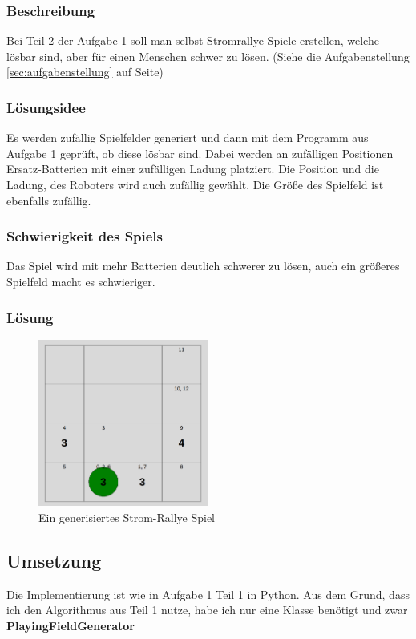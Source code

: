 \documentclass[a4paper,12pt,arial]{scrartcl}
\begin{document}
\subsubsection{Beschreibung}
Bei Teil 2 der Aufgabe 1 soll man selbst Stromrallye Spiele erstellen, welche lösbar sind, aber für einen Menschen schwer zu lösen.
(Siehe die Aufgabenstellung \ref{sec:aufgabenstellung} auf Seite\pageref{sec:aufgabenstellung})
\subsubsection{Lösungsidee}
Es werden zufällig Spielfelder generiert und dann mit dem Programm aus Aufgabe 1 geprüft, ob diese lösbar sind. Dabei werden an zufälligen Positionen Ersatz-Batterien mit einer zufälligen Ladung platziert. Die Position und die Ladung, des Roboters wird auch zufällig gewählt.
Die Größe des Spielfeld ist ebenfalls zufällig.
\subsubsection{Schwierigkeit des Spiels}
Das Spiel wird mit mehr Batterien deutlich schwerer zu lösen, auch ein größeres Spielfeld  macht es schwieriger.
\subsubsection{Lösung}
\begin{figure}[h]
    \centering
    \includegraphics[width=0.5\textwidth]{aufgabe1_2_solution.png}
    \caption{Ein generisiertes Strom-Rallye Spiel}
    \label{fig:loesung2}
\end{figure}
\newpage
\subsection{Umsetzung}
Die Implementierung ist wie in Aufgabe 1 Teil 1 in Python. Aus dem Grund, dass ich den Algorithmus aus Teil 1 nutze, habe ich nur eine Klasse benötigt und zwar \textbf{PlayingFieldGenerator}
\end{document}
